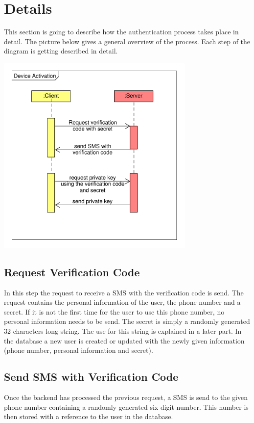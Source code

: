 \section{Details} %
This section is going to describe how the authentication process takes place in detail. The picture below gives a general overview of the process. Each step of the diagram is getting described in detail.\\
\label{Details} %
\begin{center}
\includegraphics[height=10cm]{figures/deviceactivation.pdf}
\end{center}

\subsection{Request Verification Code}
In this step the request to receive a SMS with the verification code is send. The request contains the personal information of the user, the phone number and a secret. If it is not the first time for the user to use this phone number, no personal information needs to be send. The secret is simply a randomly generated 32 characters long string. The use for this string is explained in a later part. In the database a new user is created or updated with the newly given information (phone number, personal information and secret).

\subsection{Send SMS with Verification Code}
Once the backend has processed the previous request, a SMS is send to the given phone number containing a randomly generated six digit number. This number is then stored with a reference to the user in the database.


